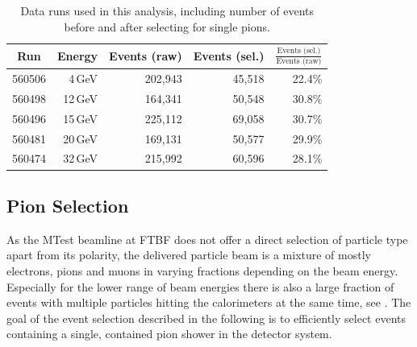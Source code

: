\documentclass[twoside,a4paper,12pt]{article}
\newcommand\piminus{\(\mathrm{\pi^-}\)}
\begin{document}
\begin{table}[htbp]
\begin{center}
\caption{Data runs used in this analysis, including number of events before and after selecting for single pions.}
\label{table:pionruns}
\begin{tabular}{r|r|r|r|r}
    \multicolumn{1}{c|}{Run} & \multicolumn{1}{c|}{Energy} & \multicolumn{1}{c|}{Events (raw)} & \multicolumn{1}{c|}{Events (sel.)} & \multicolumn{1}{c}{$\frac{\text{Events (sel.)}}{\text{Events (raw)}}$}\\\hline
   560506 & 4\,GeV & 202,943 & 45,518 & 22.4\% \\
560498 & 12\,GeV & 164,341 & 50,548 & 30.8\% \\
560496 & 15\,GeV & 225,112 & 69,058 & 30.7\% \\
560481 & 20\,GeV & 169,131 & 50,577 & 29.9\% \\
560474 & 32\,GeV & 215,992 & 60,596 & 28.1\% \\

\end{tabular}
\end{center}
\end{table}

\subsection{Pion Selection}\label{sec:pionselection}
As the MTest beamline at FTBF does not offer a direct selection of particle type apart from its polarity, the delivered particle beam is a mixture of mostly electrons, pions and muons in varying fractions depending on the beam energy. Especially for the lower range of beam energies there is also a large fraction of events with multiple particles hitting the calorimeters at the same time, see \cite{Feege,Guenter,FTBF}. The goal of the event selection described in the following is to efficiently select events containing a single, contained pion shower in the detector system. 

% 	
\end{document}
